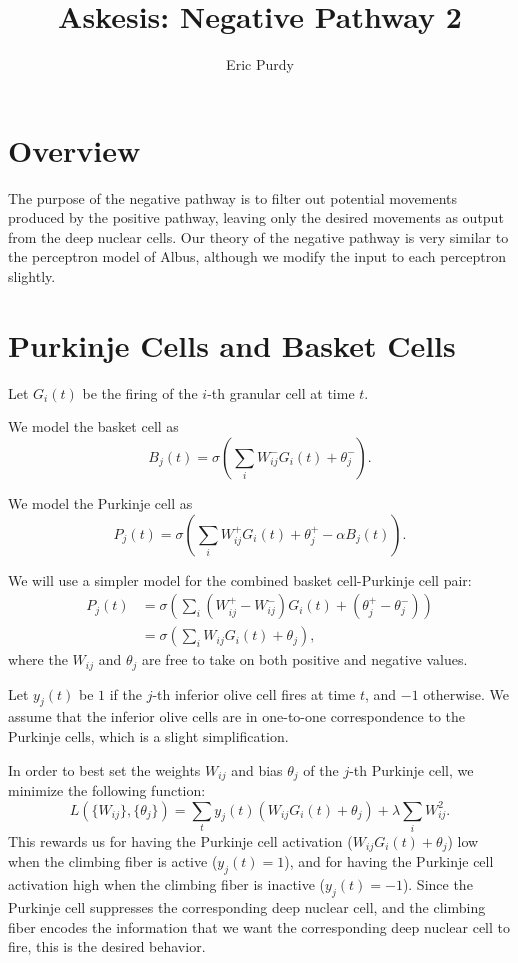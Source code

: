 \documentclass{article}
\title{Askesis: Negative Pathway 2} \author{Eric Purdy}
\theoremstyle{definition}
\begin{document}
\maketitle
\section{Overview}

The purpose of the negative pathway is to filter out potential
movements produced by the positive pathway, leaving only the desired
movements as output from the deep nuclear cells. Our theory of the
negative pathway is very similar to the perceptron model of Albus,
although we modify the input to each perceptron slightly.

\section{Purkinje Cells and Basket Cells}
\label{sec-purkinje}

Let $G_i(t)$ be the firing of the $i$-th granular cell at time $t$.

We model the basket cell as 
$$B_j(t) = \sigma \left(\sum_i W^-_{ij} G_i(t) +\theta^-_j \right).$$

We model the Purkinje cell as
$$P_j(t) = \sigma \left(\sum_i W^+_{ij} G_i(t) +\theta^+_j - \alpha B_j(t) \right).$$

We will use a simpler model for the combined basket cell-Purkinje cell
pair:
\begin{align*}
P_j(t) &= \sigma \left(\sum_i (W^+_{ij}-W^-_{ij}) G_i(t) + (\theta^+_j
- \theta^-_j)\right)\\ &= \sigma \left(\sum_i W_{ij} G_i(t) +\theta_j \right),
\end{align*}
where the $W_{ij}$ and $\theta_j$ are free to take on both positive
and negative values.

Let $y_j(t)$ be $1$ if the $j$-th inferior olive cell fires at time
$t$, and $-1$ otherwise. We assume that the inferior olive cells are
in one-to-one correspondence to the Purkinje cells, which is a slight
simplification.

In order to best set the weights $W_{ij}$ and bias $\theta_j$ of the
$j$-th Purkinje cell, we minimize the following function:
$$L(\{W_{ij}\}, \{\theta_j\}) = \sum_t y_j(t) \left(W_{ij} G_i(t) +
\theta_j\right) + \lambda \sum_i W_{ij}^2. $$ 
This rewards us for having the Purkinje cell activation ($W_{ij}
G_i(t) + \theta_j$) low when the climbing fiber is active
($y_j(t)=1$), and for having the Purkinje cell activation high when
the climbing fiber is inactive ($y_j(t)=-1$). Since the Purkinje cell
suppresses the corresponding deep nuclear cell, and the climbing fiber
encodes the information that we want the corresponding deep nuclear
cell to fire, this is the desired behavior.
\end{document}
